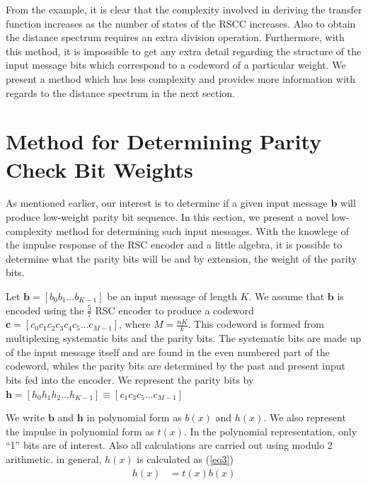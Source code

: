 \documentclass[conference]{IEEEtran}
\begin{document}
From the example, it is clear that the complexity involved in deriving the transfer function increases as the number of states of the RSCC increases. Also to obtain the distance spectrum requires an extra division operation. Furthermore, with this method, it is impossible to get any extra detail regarding the structure of the input message bits which correspond to a codeword of a particular weight. We present a method which has less complexity and provides more information with regards to the distance spectrum in the next section.

\section{Method for Determining Parity Check Bit Weights}
\label{sec4}
As mentioned earlier, our interest is to determine if a given input message $\textbf{b}$ will produce low-weight parity bit sequence. In this section, we present a novel low-complexity method for determining such input messages. With the knowlege of the impulse response of the  RSC encoder and a little algebra, it is possible to determine what the parity bits will be and by extension, the weight of the parity bits. 

Let $\textbf{b} =[b_0 b_1 ... b_{K-1}]$ be an input message of length $K$. We assume that $\textbf{b}$ is encoded using the $\frac{5}{7}$ RSC encoder to produce a codeword $\textbf{c}=[c_0 c_1 c_2 c_3 c_4 c_5 ... c_{M-1}]$, where $M=\frac{nK}{k}$. This codeword is formed from multiplexing  systematic bits and the parity bits. The systematic bits are made up of the input message itself and are found in the even numbered part of the codeword, whiles the parity bits are determined by the past and present input bits fed into the encoder. 
We represent the parity bits by 
$\textbf{h}=[h_0 h_1 h_2 ... h_{K-1}] \equiv [c_1 c_3 c_5 ... c_{M-1}]$

 We write $\textbf{b}$ and $\textbf{h}$ in polynomial form as $b(x)$ and $h(x)$. We also represent the impulse in polynomial form as $t(x)$. In the polynomial representation, only ``1'' bits are of interest. Also all calculations are carried out using modulo 2 arithmetic.
in general, $h(x)$ is calculated as (\ref{eq3})
 \begin{equation}
 \begin{split}
 h(x)&=t(x)b(x)\\
 \end{split}
 \label{eq3}
 \end{equation}
 
\end{document}
